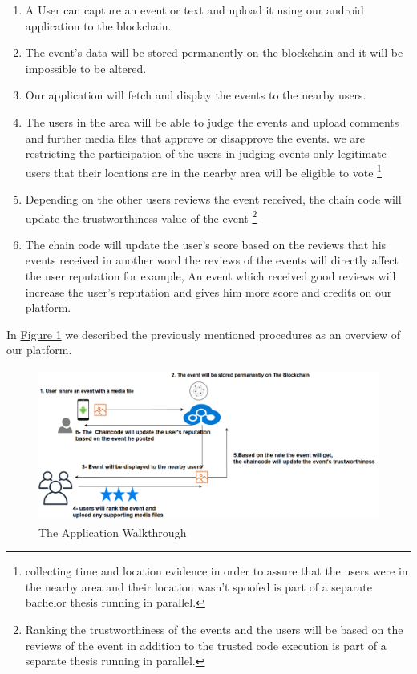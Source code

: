        \begin{enumerate}
	 \item {A User can capture an event or text and upload it using our android application to the blockchain.}
	 \item {The event's data will be stored permanently on the blockchain and it will be impossible to be altered.} 
	 \item {Our application will fetch and display the events to the nearby users.} 
         \item {The users in the area will be able to judge the events and upload comments and further media files that approve or disapprove the events.  we are restricting the participation of the users in judging events only legitimate users that their locations are in the nearby area will be eligible to vote \footnote[1]{collecting time and location evidence in order to assure that the users were in the nearby area and their location wasn't spoofed  is part of a separate bachelor thesis running in parallel.} }
         \item {Depending on the other users reviews the event received, the chain code will update the trustworthiness value of the event \footnote[2]{Ranking the trustworthiness of the events and the users will be based on the reviews of the event in addition to the trusted code execution is part of a separate thesis running in parallel. } }
          \item {The chain code will update the user's score based on the reviews that his events received in another word the reviews of the events will directly affect the user reputation for example, An event which received good reviews will increase the user's reputation and gives him more score and credits on our platform.} 
	\end{enumerate}
	In \hyperref[fig:appflow]{Figure 1} we described the previously mentioned procedures as an overview of our platform.
	\begin{figure}[H]
	\includegraphics[width=15cm,height=5cm]{images/appflow.png}
	\caption{The Application Walkthrough}
	\label{fig:appflow}
	\end{figure}

